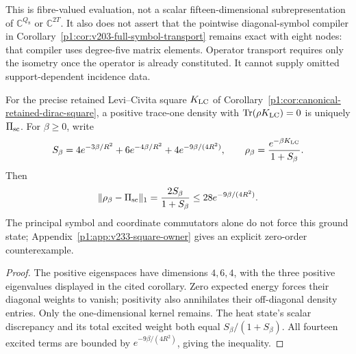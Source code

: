 \documentclass[11pt]{article}
\begin{document}
This is fibre-valued evaluation, not a scalar fifteen-dimensional
subrepresentation of \(\mathbb C^{Q_8}\) or \(\mathbb C^{2T}\).
It also does not assert that the pointwise diagonal-symbol compiler in
Corollary~\ref{p1:cor:v203-full-symbol-transport} remains exact with
eight nodes: that compiler uses degree-five matrix elements.
Operator transport requires only the isometry once the operator is
already constituted. It cannot supply omitted support-dependent
incidence data.

\begin{corollary}
\label{p1:cor:v233-geometric-ground-state}
For the precise retained Levi--Civita square \(K_{\rm LC}\) of
Corollary~\ref{p1:cor:canonical-retained-dirac-square}, a positive
trace-one density with \(\operatorname{Tr}(\rho K_{\rm LC})=0\)
is uniquely \(\Pi_{\rm sc}\). For \(\beta\ge0\), write
\[
 S_\beta=4e^{-3\beta/R^2}+6e^{-4\beta/R^2}
                   +4e^{-9\beta/(4R^2)},\qquad
 \rho_\beta=\frac{e^{-\beta K_{\rm LC}}}{1+S_\beta}.
\]
Then
\[
 \|\rho_\beta-\Pi_{\rm sc}\|_1
 =\frac{2S_\beta}{1+S_\beta}
 \le28e^{-9\beta/(4R^2)}.
\]
The principal symbol and coordinate commutators alone do not force
this ground state; Appendix~\ref{p1:app:v233-square-owner}
gives an explicit zero-order counterexample.
\end{corollary}
\begin{proof}
The positive eigenspaces have dimensions \(4,6,4\), with the three
positive eigenvalues displayed in the cited corollary. Zero expected
energy forces their diagonal weights to vanish; positivity also
annihilates their off-diagonal density entries. Only the one-dimensional
kernel remains. The heat state's scalar discrepancy and its total
excited weight both equal \(S_\beta/(1+S_\beta)\).
All fourteen excited terms are bounded by
\(e^{-9\beta/(4R^2)}\), giving the inequality.
\end{proof}
\end{document}
